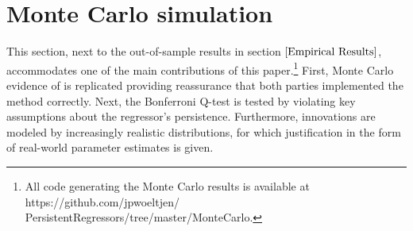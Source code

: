 \documentclass{article}
\begin{document}
\section{Monte Carlo simulation}
This section, next to the out-of-sample results in section $\ref{Empirical Results}$, accommodates one of the main contributions of this paper.\footnote{All code generating the Monte Carlo results is available at https://github.com/jpwoeltjen/\\PersistentRegressors/tree/master/MonteCarlo.} First, Monte Carlo evidence of \citet{campbell2006efficient} is replicated providing reassurance that both parties implemented the method correctly. Next, the Bonferroni Q-test is tested by violating key assumptions about the regressor's persistence. Furthermore, innovations are modeled by increasingly realistic distributions, for which justification in the form of real-world parameter estimates is given.
\label{Monte Carlo simulation}
\end{document}
